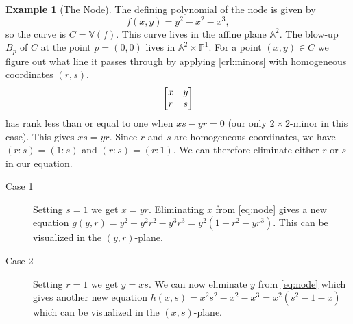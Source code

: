 \documentclass{article}
\theoremstyle{definition}
\newtheorem{example}{Example}
\newcommand{\A}{\mathbb{A}}
\newcommand{\V}{\mathbb{V}}
\renewcommand{\P}{\mathbb{P}}
\begin{document}
\begin{example}[The Node]
    The defining polynomial of the node is given by
    \begin{equation}
        \label{eq:node}
        f(x, y) = y^2 - x^2 - x^3,
    \end{equation}
    so the curve is $C = \V(f)$. This curve lives in the affine plane $\A^2$.
    The blow-up $B_p$ of $C$ at the point $p = (0, 0)$ lives in $\A^2 \times
    \P^1$. For a point $(x, y) \in C$ we figure out what line it passes through
    by applying \cref{crl:minors} with homogeneous coordinates $(r, s)$.
    \begin{equation}
        \notag
        \begin{bmatrix}
            x & y \\
            r & s
        \end{bmatrix}
    \end{equation}
    has rank less than or equal to one when $xs - yr = 0$ (our only
    $2\times2$-minor in this case). This gives $xs = yr$. Since $r$ and $s$ are
    homogeneous coordinates, we have $(r : s) = (1 : s)$ and $(r : s) = (r :
    1)$. We can therefore eliminate either $r$ or $s$ in our equation. 

    \begin{description}
        \item[Case 1] Setting $s = 1$ we get $x = yr$. Eliminating $x$ from
            \cref{eq:node} gives a new equation $g(y, r) = y^2 - y^2r^2 -
            y^3r^3 = y^2(1 - r^2 - yr^3)$. This can be visualized in the $(y,
            r)$-plane.
        \item[Case 2] Setting $r = 1$ we get $y = xs$. We can now eliminate $y$
            from \cref{eq:node} which gives another new equation $h(x, s) =
            x^2s^2 - x^2 - x^3 = x^2(s^2 - 1 - x)$ which can be visualized in
            the $(x, s)$-plane.
    \end{description}
\end{example}
\end{document}
